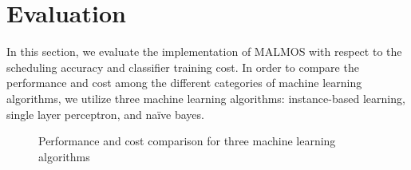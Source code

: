 \documentclass[10pt, conference, compsocconf]{IEEEtran}
\begin{document}
{\section{Evaluation}
%
In this section, we evaluate the implementation of MALMOS with
respect to the scheduling accuracy and classifier training cost.
%
In order to compare the performance and cost among the different
categories of machine learning algorithms, we utilize three machine
learning algorithms: instance-based learning, single layer perceptron,
and na\"{i}ve bayes.
%
\begin{figure}[ht]
\centering
{}
\caption{Performance and cost comparison for three machine learning
algorithms}
\end{figure}
%
}
\end{document}
